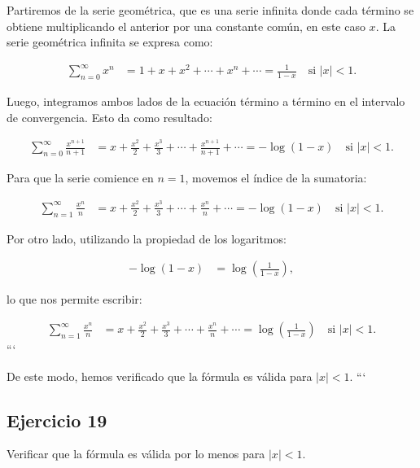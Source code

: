 \documentclass{article}
\begin{document}
    Partiremos de la serie geométrica, que es una serie infinita donde cada término se obtiene multiplicando el anterior por una constante común, en este caso $x$. La serie geométrica infinita se expresa como:

    \begin{align*}
    \sum_{n=0}^{\infty} x^{n} &= 1 + x + x^{2} + \cdots + x^{n} + \cdots = \frac{1}{1-x} \quad \text{si } |x| < 1.
    \end{align*}

    Luego, integramos ambos lados de la ecuación término a término en el intervalo de convergencia. Esto da como resultado:

    \begin{align*}
    \sum_{n=0}^{\infty} \frac{x^{n+1}}{n+1} &= x + \frac{x^{2}}{2} + \frac{x^{3}}{3} + \cdots + \frac{x^{n+1}}{n+1} + \cdots = -\log (1-x) \quad \text{si } |x| < 1.
    \end{align*}

    Para que la serie comience en $n=1$, movemos el índice de la sumatoria:

    \begin{align*}
    \sum_{n=1}^{\infty} \frac{x^{n}}{n} &= x + \frac{x^{2}}{2} + \frac{x^{3}}{3} + \cdots + \frac{x^{n}}{n} + \cdots = -\log (1-x) \quad \text{si } |x| < 1.
    \end{align*}

    Por otro lado, utilizando la propiedad de los logaritmos:

    \begin{align*}
    -\log (1-x) &= \log \left(\frac{1}{1-x}\right),
    \end{align*}

    lo que nos permite escribir:

    \begin{align*}
    \sum_{n=1}^{\infty} \frac{x^{n}}{n} &= x + \frac{x^{2}}{2} + \frac{x^{3}}{3} + \cdots + \frac{x^{n}}{n} + \cdots = \log \left(\frac{1}{1-x}\right) \quad \text{si } |x| < 1.
    \end{align*}
    ```

    De este modo, hemos verificado que la fórmula es válida para $|x|<1$.
    ```

    \subsection*{Ejercicio 19}

    Verificar que la fórmula es válida por lo menos para $|x|<1$.
\end{document}
